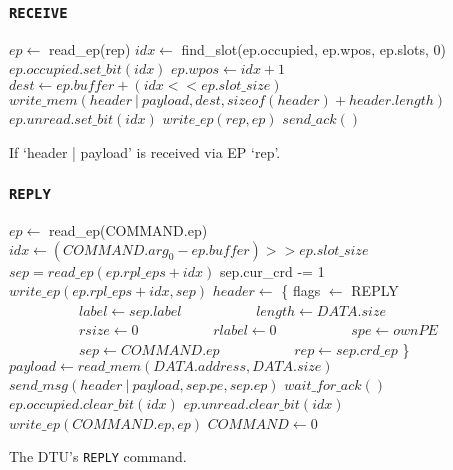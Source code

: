\documentclass[a4paper,11pt,draft]{article}
\begin{document}
\subsubsection{\texttt{RECEIVE}}

\begin{algorithm}[H]
    $ep \gets$ read\_ep(rep)\;
    \BlankLine
    $idx \gets$ find\_slot(ep.occupied, ep.wpos, ep.slots, 0)\;
    $ep.occupied.set\_bit(idx)$\;
    $ep.wpos \gets idx + 1$\;
    \BlankLine
    $dest \gets ep.buffer + (idx << ep.slot\_size)$\;
    $write\_mem(header\ |\ payload, dest, sizeof(header) + header.length)$\;
    $ep.unread.set\_bit(idx)$\;
    $write\_ep(rep, ep)$\;
    \BlankLine
    $send\_ack()$\;
    \caption{If `header | payload' is received via EP `rep'.}
\end{algorithm}

\subsubsection{\texttt{REPLY}}

\begin{algorithm}[H]
    $ep \gets$ read\_ep(COMMAND.ep)\;
    \BlankLine
    $idx \gets (COMMAND.arg_0 - ep.buffer) >> ep.slot\_size$\;
    $sep = read\_ep(ep.rpl\_eps + idx)$\;
    \BlankLine
    sep.cur\_crd -= 1\;
    $write\_ep(ep.rpl\_eps + idx, sep)$\;
    \BlankLine
    $header \gets$ \{ flags $\gets$ REPLY\;
    $\quad\quad\quad\quad\quad label \gets sep.label$\;
    $\quad\quad\quad\quad\quad length \gets DATA.size$\;
    $\quad\quad\quad\quad\quad rsize \gets 0$\;
    $\quad\quad\quad\quad\quad rlabel \gets 0$\;
    $\quad\quad\quad\quad\quad spe \gets ownPE$\;
    $\quad\quad\quad\quad\quad sep \gets COMMAND.ep$\;
    $\quad\quad\quad\quad\quad rep \gets sep.crd\_ep$ \}\;
    $payload \gets read\_mem(DATA.address, DATA.size)$\;
    $send\_msg(header\ |\ payload, sep.pe, sep.ep)$\;
    $wait\_for\_ack()$\;
    \BlankLine
    $ep.occupied.clear\_bit(idx)$\;
    $ep.unread.clear\_bit(idx)$\;
    $write\_ep(COMMAND.ep, ep)$\;
    \BlankLine
    $COMMAND \gets 0$\;
    \caption{The DTU's \texttt{REPLY} command.}
\end{algorithm}
\end{document}
